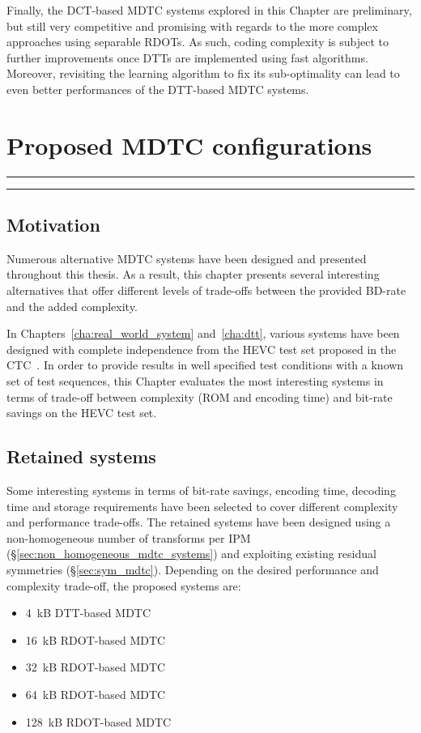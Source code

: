 \documentclass[11pt,a4paper,openright,twoside]{book}
\providecommand{\chaptertoc}{
	\startcontents[chapters]
	\hrule
	\vspace{1em}
	\printcontents[chapters]{}{1}{{\sf\large\bfseries Contents}}
	\vspace{1em}
	\hrule
}
\numberwithin{equation}{section} %
\numberwithin{figure}{section} %
\numberwithin{table}{section} %
\begin{document}
Finally, the \ac{DCT}-based \ac{MDTC} systems explored in this Chapter are
preliminary, but still very competitive and promising with regards to the more
complex approaches using separable \acp{RDOT}.
As such, coding complexity is subject to further improvements once \acp{DTT}
are implemented using fast algorithms.
Moreover, revisiting the learning algorithm to fix its sub-optimality can lead
to even better performances of the \ac{DTT}-based \ac{MDTC} systems.

\chapter{Proposed \acs{MDTC} configurations}
\label{cha:proposed_mdtc_configurations}
\chaptertoc

\section{Motivation}
\label{sec:summary_motivation}

Numerous alternative \acs{MDTC} systems have been designed and presented
throughout this thesis.
As a result, this chapter presents several interesting alternatives that offer
different levels of trade-offs between the provided \acs{BD}-rate and the
added complexity.

In Chapters~\ref{cha:real_world_system} and~\ref{cha:dtt}, various systems
have been designed with complete independence from the \ac{HEVC} test set
proposed in the \ac{CTC}~\cite{bossen-12-common-test-conditions}.
In order to provide results in well specified test conditions with a known set
of test sequences, this Chapter evaluates the most interesting systems in
terms of trade-off between complexity (\acs{ROM} and encoding time) and
bit-rate savings on the \ac{HEVC} test set.

\section{Retained systems}
\label{sec:retained_systems}

Some interesting systems in terms of bit-rate savings, encoding time, decoding
time and storage requirements have been selected to cover different complexity
and performance trade-offs.
The retained systems have been designed using a non-homogeneous number of
transforms per \ac{IPM} (\S\ref{sec:non_homogeneous_mdtc_systems}) and
exploiting existing residual symmetries (\S\ref{sec:sym_mdtc}).
Depending on the desired performance and complexity trade-off, the proposed
systems are:
\begin{itemize}
	\item \SI{4}{\kilo B} \acs{DTT}-based \acs{MDTC}
	\item \SI{16}{\kilo B} \acs{RDOT}-based \acs{MDTC}
	\item \SI{32}{\kilo B} \acs{RDOT}-based \acs{MDTC}
	\item \SI{64}{\kilo B} \acs{RDOT}-based \acs{MDTC}
	\item \SI{128}{\kilo B} \acs{RDOT}-based \acs{MDTC}
\end{itemize}
\end{document}
